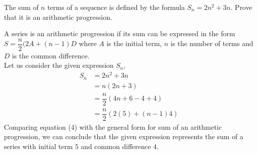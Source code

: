 
%
%
%
%
% 
% 

\question[4] The sum of $n$ terms of a sequence is defined by the formula $S_n=2n^2+3n$. Prove that it is an arithmetic progression.


\ifprintanswers
\fi 

\begin{solution}[\halfpage]
  A series is an arithmetic progression if its sum can be expressed in the form $S = \dfrac{n}{2}(2A + (n-1)D$ where $A$ is the initial term, $n$ is the number of terms and $D$ is the common difference. \\
  Let us consider the given expression $S_n$,
  \begin{align}
    S_n &= 2n^2 + 3n \\
        &= n(2n + 3) \\
        &= \dfrac{n}{2}(4n + 6 - 4 + 4) \\
        &= \dfrac{n}{2}(2(5) + (n-1)4)
  \end{align}
  Comparing equation (4) with the general form for sum of an arithmetic progression, we can conclude that the given expression represents the sum of a series with initial term $5$ and common difference $4$.
\end{solution}
